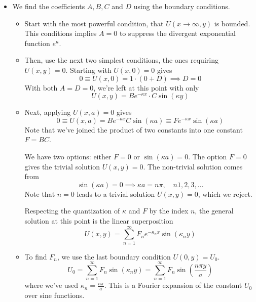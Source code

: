 \documentclass[11pt, a4paper]{article}
\begin{document}
\begin{itemize}
	
	\item We find the coefficients $ A, B, C $ and $ D $ using the boundary conditions. 
	\begin{itemize}
		\item Start with the most powerful condition, that $ U(x \to \infty, y) $ is bounded. This conditions implies $ A = 0 $ to suppress the divergent exponential function $ e^{\kappa } $. 
			
		\item Then, use the next two simplest conditions, the ones requiring $ U(x, y) = 0 $. Starting with $ U(x, 0) = 0 $ gives
		\begin{equation*}
			0 \equiv U(x, 0) = 1 \cdot (0 + D) \implies D = 0
		\end{equation*}
		With both $ A = D = 0 $, we're left at this point with only 
		\begin{equation*}
			U(x, y) = Be^{-\kappa x} \cdot C \sin (\kappa y)
		\end{equation*}
		
		\item Next, applying $ U(x, a) = 0$ gives
		\begin{equation*}
			0 \equiv U(x, a) = Be^{-\kappa x} C \sin (\kappa a) \equiv F e^{-\kappa x} \sin (\kappa a)
		\end{equation*} 
		Note that we've joined the product of two constants into one constant $ F = BC $. 
		
		We have two options: either $ F = 0 $ or $ \sin (\kappa a) = 0$. The option $ F = 0 $ gives the trivial solution $ U(x, y) = 0 $. The non-trivial solution comes from 
		\begin{equation*}
			\sin(\kappa a ) = 0 \implies \kappa a = n \pi, \quad n 1, 2, 3, \ldots
		\end{equation*}
		Note that $ n = 0 $ leads to a trivial solution $ U(x, y) = 0 $, which we reject.
		
		Respecting the quantization of $ \kappa $ and $ F $ by the index $ n $, the general solution at this point is the linear superposition
		\begin{equation*}
			U(x, y) = \sum_{n=1}^{\infty} F_{n} e^{-\kappa_{n}x}\sin(\kappa_{n}y)
		\end{equation*}
		
		\item To find $ F_{n} $, we use the last boundary condition $ U(0, y) = U_{0} $.
		\begin{equation*}
			U_{0} = \sum_{n=1}^{\infty} F_{n} \sin(\kappa_{n}y) = \sum_{n=1}^{\infty} F_{n} \sin(\frac{n\pi y}{a})
		\end{equation*}
		where we've used $ \kappa_{n} = \frac{n\pi}{a} $. This is a Fourier expansion of the constant $ U_{0} $ over sine functions. 
		

\end{itemize}
\end{itemize}
\end{document}
